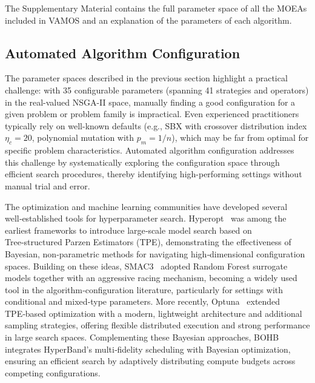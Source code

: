 \documentclass[final,5p,times,twocolumn]{elsarticle}
\newcommand{\VAMOS}{VAMOS}
\begin{document}
The Supplementary Material contains the full parameter space of all the MOEAs included in \VAMOS{} and an explanation of the parameters of each algorithm.

\subsection{Automated Algorithm Configuration}
\label{sec:aac}

The parameter spaces described in the previous section highlight a practical challenge: with 35 configurable parameters (spanning 41 strategies and operators) in the real-valued NSGA-II space, manually finding a good configuration for a given problem or problem family is impractical. Even experienced practitioners typically rely on well-known defaults (e.g., SBX with crossover distribution index $\eta_c = 20$, polynomial mutation with $p_m = 1/n$), which may be far from optimal for specific problem characteristics. Automated algorithm configuration addresses this challenge by systematically exploring the configuration space through efficient search procedures, thereby identifying high-performing settings without manual trial and error.


The optimization and machine learning communities have developed several well‑established tools for hyperparameter search. Hyperopt~\cite{bergstra2013making} was among the earliest frameworks to introduce large‑scale model search based on Tree‑structured Parzen Estimators (TPE), demonstrating the effectiveness of Bayesian, non‑parametric methods for navigating high‑dimensional configuration spaces. Building on these ideas, SMAC3~\cite{LEF+22} adopted Random Forest surrogate models together with an aggressive racing mechanism, becoming a widely used tool in the algorithm‑configuration literature, particularly for settings with conditional and mixed‑type parameters. More recently, Optuna~\cite{ASY+19} extended TPE‑based optimization with a modern, lightweight architecture and additional sampling strategies, offering flexible distributed execution and strong performance in large search spaces. Complementing these Bayesian approaches, BOHB~\cite{FKH18} integrates HyperBand’s multi‑fidelity scheduling with Bayesian optimization, ensuring an efficient search by adaptively distributing compute budgets across competing configurations.
\end{document}
